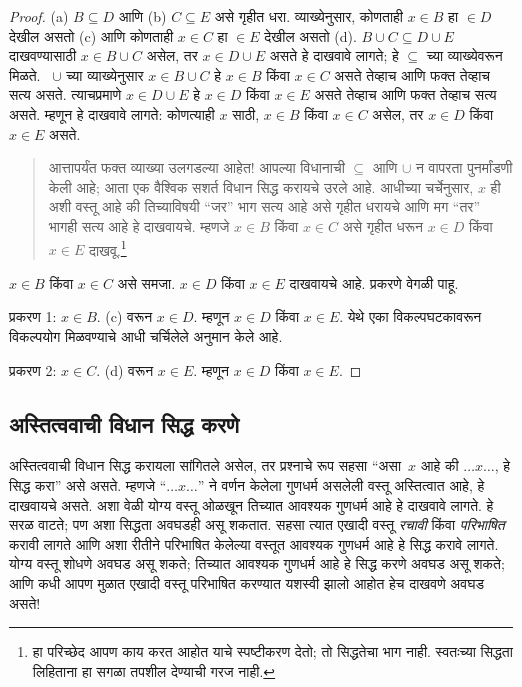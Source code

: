 \documentclass[../../../include/open-logic-section]{subfiles}
\begin{document}
\begin{proof}
(a) $B \subseteq D$ आणि (b) $C \subseteq E$ असे गृहीत धरा. व्याख्येनुसार, कोणताही $x \in B$ हा $\in D$ देखील असतो (c) आणि कोणताही $x \in C$ हा $\in E$ देखील असतो (d). $B \cup C \subseteq D \cup E$ दाखवण्यासाठी $x \in B \cup C$ असेल, तर $x \in D \cup E$ असते हे दाखवावे लागते; हे $\subseteq$ च्या व्याख्येवरून मिळते. ~$ \cup$ च्या व्याख्येनुसार $x \in B \cup C$ हे $x \in B$ किंवा $x \in C$ असते तेव्हाच आणि फक्त तेव्हाच सत्य असते. त्याचप्रमाणे $x \in D \cup E$ हे $x \in D$ किंवा $x \in E$ असते तेव्हाच आणि फक्त तेव्हाच सत्य असते. म्हणून हे दाखवावे लागते: कोणत्याही $x$ साठी, $x \in B$ किंवा $x \in C$ असेल, तर $x \in D$ किंवा $x \in E$ असते.

\begin{quote}
आत्तापर्यंत फक्त व्याख्या उलगडल्या आहेत!{} आपल्या विधानाची $\subseteq$ आणि $\cup$ न वापरता पुनर्मांडणी केली आहे; आता एक वैश्विक सशर्त विधान सिद्ध करायचे उरले आहे. आधीच्या चर्चेनुसार, $x$ ही अशी वस्तू आहे की तिच्याविषयी “जर” भाग सत्य आहे असे गृहीत धरायचे आणि मग “तर” भागही सत्य आहे हे दाखवायचे. म्हणजे $x \in B$ किंवा $x \in C$ असे गृहीत धरून $x \in D$ किंवा $x \in E$ दाखवू.\footnote{हा परिच्छेद आपण काय करत आहोत याचे स्पष्टीकरण देतो; तो सिद्धतेचा भाग नाही. स्वतःच्या सिद्धता लिहिताना हा सगळा तपशील देण्याची गरज नाही.}
\end{quote}

$x \in B$ किंवा $x \in C$ असे समजा. $x \in D$ किंवा $x \in E$ दाखवायचे आहे. प्रकरणे वेगळी पाहू.

प्रकरण 1: $x \in B$. (c) वरून $x \in D$. म्हणून $x \in D$ किंवा $x \in E$. येथे एका विकल्पघटकावरून विकल्पयोग मिळवण्याचे आधी चर्चिलेले अनुमान केले आहे.

प्रकरण 2: $x \in C$. (d) वरून $x \in E$. म्हणून $x \in D$ किंवा $x \in E$.
\end{proof}

\subsection{अस्तित्ववाची विधान सिद्ध करणे}

अस्तित्ववाची विधान सिद्ध करायला सांगितले असेल, तर प्रश्नाचे रूप सहसा “असा~$x$ आहे की $\dots x \dots$, हे सिद्ध करा” असे असते. म्हणजे “$\dots x \dots$” ने वर्णन केलेला गुणधर्म असलेली वस्तू अस्तित्वात आहे, हे दाखवायचे असते. अशा वेळी योग्य वस्तू ओळखून तिच्यात आवश्यक गुणधर्म आहे हे दाखवावे लागते. हे सरळ वाटते; पण अशा सिद्धता अवघडही असू शकतात. सहसा त्यात एखादी वस्तू \emph{रचावी} किंवा \emph{परिभाषित} करावी लागते आणि अशा रीतीने परिभाषित केलेल्या वस्तूत आवश्यक गुणधर्म आहे हे सिद्ध करावे लागते. योग्य वस्तू शोधणे अवघड असू शकते; तिच्यात आवश्यक गुणधर्म आहे हे सिद्ध करणे अवघड असू शकते; आणि कधी आपण मुळात एखादी वस्तू परिभाषित करण्यात यशस्वी झालो आहोत हेच दाखवणे अवघड असते!{}
\end{document}
